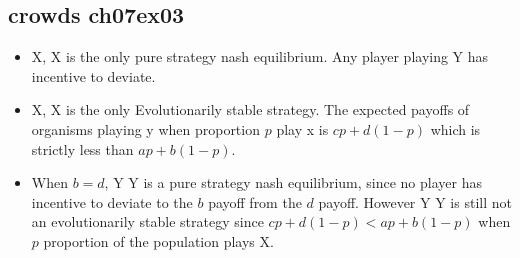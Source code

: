 \documentclass{article}
\begin{document}
\subsection{crowds ch07ex03}
\begin{itemize}
	\item X, X is the only pure strategy nash equilibrium.
			Any player playing Y has incentive to deviate.
	\item X, X is the only Evolutionarily stable strategy.
			The expected payoffs of organisms playing y when proportion $p$ play x is $cp + d(1-p)$ which is strictly less than $ap + b(1-p)$.
	\item When $b=d$, Y Y is a pure strategy nash equilibrium, since no player has incentive to deviate to the $b$ payoff from the $d$ payoff.
			However Y Y is still not an evolutionarily stable strategy since $cp + d(1-p) < ap + b(1-p)$ when $p$ proportion of the population plays X.
\end{itemize}
\end{document}
